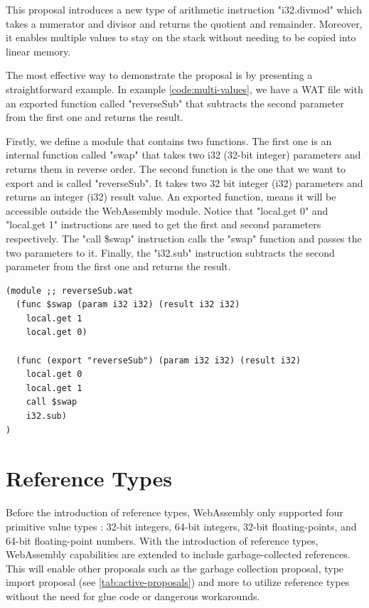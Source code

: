 This proposal introduces a new type of arithmetic instruction "i32.divmod" \cite{fitzgerald_2019_multivalue, webassemblycommunitygroup_2023_webassembly} which takes a numerator and divisor and returns the quotient and remainder. Moreover, it enables multiple values to stay on the stack without needing to be copied into linear memory.

The most effective way to demonstrate the proposal is by presenting a straightforward example. In example \ref{code:multi-values}, we have a WAT file with an exported function called "reverseSub" that subtracts the second parameter from the first one and returns the result. 

Firstly, we define a module that contains two functions. The first one is an internal function called "swap" that takes two i32 (32-bit integer) parameters and returns them in reverse order. The second function is the one that we want to export and is called "reverseSub". It takes two 32 bit integer (i32) parameters and returns an integer (i32) result value. An exported function, means it will be accessible outside the WebAssembly module. Notice that "local.get 0" and "local.get 1" instructions are used to get the first and second parameters respectively. The "call \$swap" instruction calls the "swap" function and passes the two parameters to it. Finally, the "i32.sub" instruction \cite{webassemblycommunitygroup_2023_webassembly} subtracts the second parameter from the first one and returns the result.

\begin{lstlisting}[frame=lines, style=Wasm, caption={A Wasm module with a reverse subtraction function returning multiple values}, showstringspaces=false, captionpos=b, label=code:multi-values]
(module ;; reverseSub.wat
  (func $swap (param i32 i32) (result i32 i32)
    local.get 1
    local.get 0)

  (func (export "reverseSub") (param i32 i32) (result i32)
    local.get 0
    local.get 1
    call $swap
    i32.sub)
)
\end{lstlisting}

\section{Reference Types}
\label{sec:reference-types}

Before the introduction of reference types, WebAssembly only supported four primitive value types \cite{webassemblycommunitygroup_2023_webassembly}: 32-bit integers, 64-bit integers, 32-bit floating-points, and 64-bit floating-point numbers. With the introduction of reference types, WebAssembly capabilities are extended to include garbage-collected references. This will enable other proposals \cite{couriol_2020_webassembly} such as the garbage collection proposal, type import proposal (see \autoref{tab:active-proposals}) and more to utilize reference types without the need for glue code or dangerous workarounds. 

